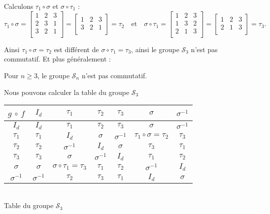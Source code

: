 \documentclass{book}
\begin{document}
\bigskip

Calculons $\tau_1 \circ \sigma$ et $\sigma \circ \tau_1$ :
$$\tau_1 \circ \sigma
=\left[\begin{smallmatrix}
 1 & 2 & 3 \\
 2 & 3 & 1 \\
 3 & 2 & 1 \\
        \end{smallmatrix} \right]
= \left[\begin{smallmatrix}
 1 & 2 & 3 \\
 3 & 2 & 1 \\
        \end{smallmatrix} \right]
= \tau_2
\quad \text{et} \quad
\sigma \circ \tau_1
= \left[\begin{smallmatrix}
 1 & 2 & 3 \\
 1 & 3 & 2 \\
 2 & 1 & 3 \\
        \end{smallmatrix} \right]
= \left[\begin{smallmatrix}
 1 & 2 & 3 \\
 2 & 1 & 3 \\
        \end{smallmatrix} \right]
= \tau_3.
 $$

Ainsi $\tau_1 \circ \sigma = \tau_2$ est différent de $\sigma \circ \tau_1=\tau_3$,
ainsi le groupe $\mathcal{S}_3$ n'est pas commutatif. Et plus généralement :
\begin{Lemme}
Pour $n\ge 3$, le groupe $\mathcal{S}_n$ n'est pas commutatif.
\end{Lemme}



\bigskip

Nous pouvons calculer la table du groupe $\mathcal{S}_3$
\begin{Figure}
\centering
\begin{tabular}{c||c|c|c|c|c|c}
$g$ $\circ$ $f$  & $I_d$ &$\tau_1$
 & $\tau_2$ & $\tau_3$
&  $\sigma$ & $\sigma^{-1}$ \\ \hline\hline
$I_d$ & $I_d$ & $\tau_1$ & $\tau_2$ & $\tau_3$ & $\sigma$ & $\sigma^{-1}$ \\ \hline

$\tau_1$ & $\tau_1$ & $I_d$ & $\sigma$ & $\sigma^{-1}$ & $\tau_1 \circ \sigma = \tau_2$ & $\tau_3$ \\ \hline

$\tau_2$ & $\tau_2$  & $\sigma^{-1}$ & $I_d$ & $\sigma$ & $\tau_3$ & $\tau_1$ \\ \hline

$\tau_3$ & $\tau_3$ & $\sigma$ & $\sigma^{-1}$ & $I_d$ & $\tau_1$ & $\tau_2$ \\ \hline

$\sigma$ & $\sigma$ &$\sigma \circ \tau_1=\tau_3$ & $\tau_1$ & $\tau_2$ & $\sigma^{-1}$ & $I_d$ \\ \hline

$\sigma^{-1}$ & $\sigma^{-1}$ & $\tau_2$ & $\tau_3$ & $\tau_1$ & $I_d$ & $\sigma$ \\
\end{tabular}\\
Table du groupe $\mathcal{S}_3$
\end{Figure}
\end{document}
